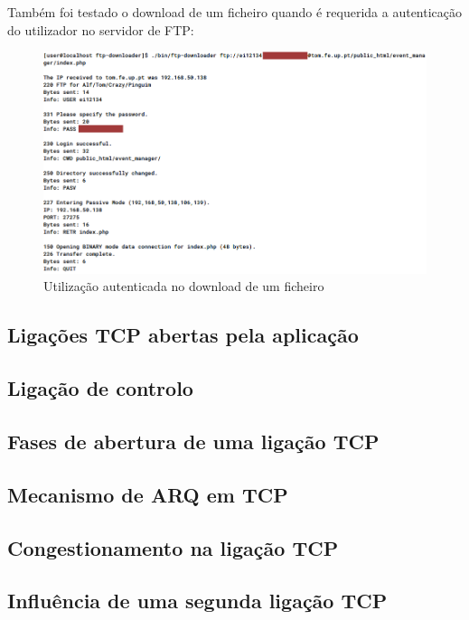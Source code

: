 \documentclass[a4paper,11pt,titlepage]{article}
\begin{document}
Também foi testado o download de um ficheiro quando é requerida a autenticação
do utilizador no servidor de FTP:

\begin{figure}[H]
    \center
    \includegraphics[scale=0.45]{res/authenticated.png}
    \caption{Utilização autenticada no download de um ficheiro}
    \label{fig:authenticated.png}
\end{figure}

\subsection*{Ligações TCP abertas pela aplicação}

\subsection*{Ligação de controlo}

\subsection*{Fases de abertura de uma ligação TCP}

\subsection*{Mecanismo de ARQ em TCP}

\subsection*{Congestionamento na ligação TCP}

\subsection*{Influência de uma segunda ligação TCP}
\end{document}
